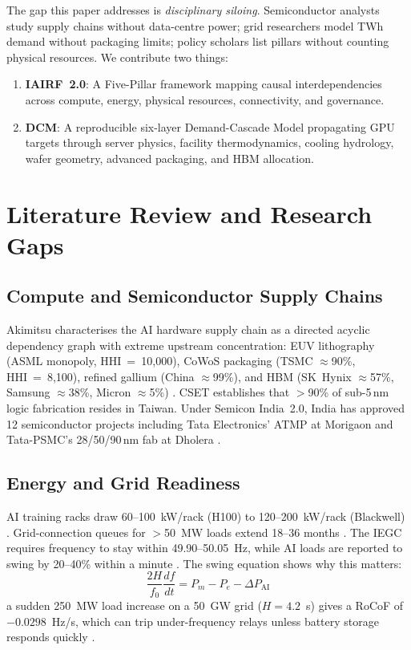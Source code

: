 \documentclass[conference]{IEEEtran}
\begin{document}
The gap this paper addresses is \textit{disciplinary siloing}. Semiconductor analysts study supply chains without data-centre power; grid researchers model TWh demand without packaging limits; policy scholars list pillars without counting physical resources. We contribute two things:

\begin{enumerate}[leftmargin=*, label=\textbf{C\arabic*.}, noitemsep, topsep=2pt]
  \item \textbf{IAIRF~2.0}: A Five-Pillar framework mapping causal interdependencies across compute, energy, physical resources, connectivity, and governance.
  \item \textbf{DCM}: A reproducible six-layer Demand-Cascade Model propagating GPU targets through server physics, facility thermodynamics, cooling hydrology, wafer geometry, advanced packaging, and HBM allocation.
\end{enumerate}

\section{Literature Review and Research Gaps}

\subsection{Compute and Semiconductor Supply Chains}
Akimitsu \cite{akimitsu2026chokepoints} characterises the AI hardware supply chain as a directed acyclic dependency graph with extreme upstream concentration: EUV lithography (ASML monopoly, HHI~=~10{,}000), CoWoS packaging (TSMC $\approx$90\%, HHI~=~8{,}100), refined gallium (China $\approx$99\%), and HBM (SK~Hynix $\approx$57\%, Samsung $\approx$38\%, Micron $\approx$5\%) \cite{counterpoint2025hbm}. CSET \cite{cset2024compute} establishes that $>$90\% of sub-5\,nm logic fabrication resides in Taiwan. Under Semicon India~2.0, India has approved 12 semiconductor projects including Tata Electronics' ATMP at Morigaon and Tata-PSMC's 28/50/90\,nm fab at Dholera \cite{ism2025semicon}.

\subsection{Energy and Grid Readiness}
AI training racks draw 60--100~kW/rack (H100) to 120--200~kW/rack (Blackwell) \cite{nvidia2024h100}. Grid-connection queues for $>$50~MW loads extend 18--36 months \cite{cea2026transmission}. The IEGC requires frequency to stay within 49.90--50.05~Hz, while AI loads are reported to swing by 20--40\% within a minute \cite{fsr2026powergrid}. The swing equation shows why this matters:
\begin{equation}
  \frac{2H}{f_0}\frac{df}{dt} = P_m - P_e - \Delta P_{\text{AI}}
  \label{eq:swing}
\end{equation}
a sudden 250~MW load increase on a 50~GW grid ($H=4.2$~s) gives a RoCoF of $-0.0298$~Hz/s, which can trip under-frequency relays unless battery storage responds quickly \cite{fsr2026powergrid}.
\end{document}
